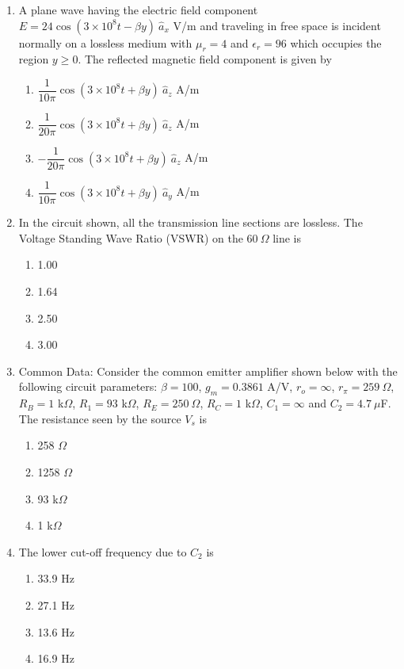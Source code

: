 \documentclass[journal,12pt,onecolumn]{IEEEtran}
\begin{document}
\begin{enumerate}
\item A plane wave having the electric field component $E=24\cos(3\times 10^8 t - \beta y)\ \hat{a}_x$ V/m and traveling in free space is incident normally on a lossless medium with $\mu_r=4$ and $\epsilon_r=96$ which occupies the region $y\ge 0$. The reflected magnetic field component is given by
\begin{multicols}{2}
\begin{enumerate}
\item $\dfrac{1}{10\pi}\cos(3\times10^8 t + \beta y)\ \hat{a}_z$ A/m
\item $\dfrac{1}{20\pi}\cos(3\times10^8 t + \beta y)\ \hat{a}_z$ A/m
\item $-\dfrac{1}{20\pi}\cos(3\times10^8 t + \beta y)\ \hat{a}_z$ A/m
\item $\dfrac{1}{10\pi}\cos(3\times10^8 t + \beta y)\ \hat{a}_y$ A/m
\end{enumerate}
\end{multicols}

\item In the circuit shown, all the transmission line sections are lossless. The Voltage Standing Wave Ratio (VSWR) on the $60\ \Omega$ line is
\begin{multicols}{2}
\begin{enumerate}
\item 1.00
\item 1.64
\item 2.50
\item 3.00
\end{enumerate}
\end{multicols}

\item Common Data: Consider the common emitter amplifier shown below with the following circuit parameters: $\beta=100$, $g_m=0.3861$ A/V, $r_o=\infty$, $r_\pi=259\ \Omega$, $R_B=1$ k$\Omega$, $R_1=93$ k$\Omega$, $R_E=250\ \Omega$, $R_C=1$ k$\Omega$, $C_1=\infty$ and $C_2=4.7\ \mu$F. The resistance seen by the source $V_s$ is
\begin{multicols}{2}
\begin{enumerate}
\item 258 $\Omega$
\item 1258 $\Omega$
\item 93 k$\Omega$
\item 1 k$\Omega$
\end{enumerate}
\end{multicols}

\item The lower cut-off frequency due to $C_2$ is
\begin{multicols}{2}
\begin{enumerate}
\item 33.9 Hz
\item 27.1 Hz
\item 13.6 Hz
\item 16.9 Hz
\end{enumerate}
\end{multicols}


\end{enumerate}
\end{document}

